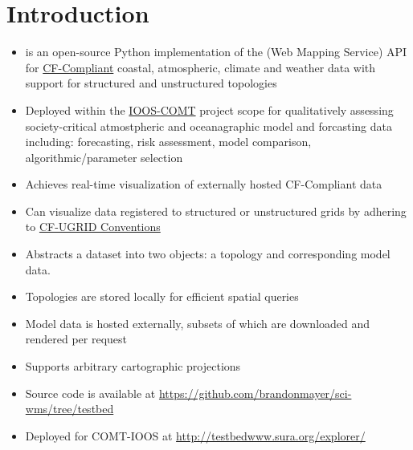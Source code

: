 \documentclass[noback,noborder,portrait,twocolumn]{cuposter}
\begin{document}
\section{Introduction}
\begin{itemize}
  \item \sciwms{} is an open-source Python implementation of the
    \href{http://www.opengeospatial.org/standards/wms}{\color{blue}\ogc{}
      \wms{}} (Web Mapping Service) API for
    \href{http://cfconventions.org/}{\color{blue}CF-Compliant}
    coastal, atmospheric, climate and weather data with support for
    structured and unstructured topologies
  
  \item Deployed within the
    \href{http://www.ioos.noaa.gov/modeling/testbed.html}{{\color{blue}IOOS-COMT}}
    project scope for qualitatively assessing society-critical
    atmostpheric and oceanagraphic model and forcasting data
    including: forecasting, risk assessment, model comparison,
    algorithmic/parameter selection
    
  \item Achieves real-time visualization of
    externally hosted CF-Compliant data

  \item Can visualize data registered to structured or unstructured
    grids by adhering to
    \href{https://github.com/ugrid-conventions/ugrid-conventions/blob/v0.9.0/ugrid-conventions.md}{\color{blue}CF-UGRID
      Conventions}

  \item Abstracts a dataset into two objects: a topology
      and corresponding model data.
    
  \item Topologies are stored locally for efficient spatial queries

  \item Model data is hosted externally, subsets of which are
    downloaded and rendered per request

  \item Supports arbitrary cartographic projections 
  
  \item Source code is available at {\color{blue}
    \url{https://github.com/brandonmayer/sci-wms/tree/testbed}}
    
  \item Deployed for COMT-IOOS at {\color{blue}
    \url{http://testbedwww.sura.org/explorer/}}
\end{itemize}
\end{document}
